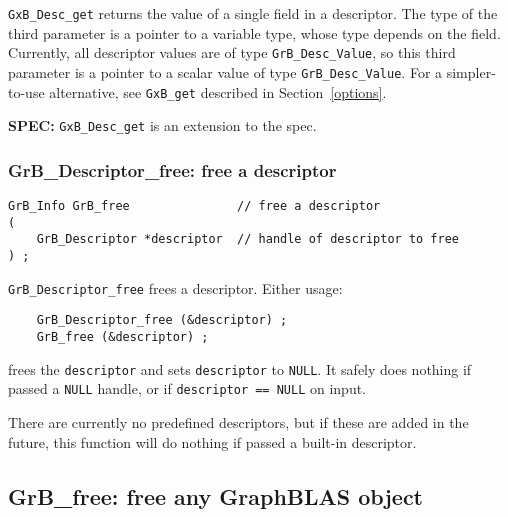\documentclass[12pt]{article}
\begin{document}
\verb'GxB_Desc_get' returns the value of a single field in a descriptor.  The
type of the third parameter is a pointer to a variable type, whose type depends
on the field.  Currently, all descriptor values are of type
\verb'GrB_Desc_Value', so this third parameter is a pointer to a scalar value of
type \verb'GrB_Desc_Value'.  For a simpler-to-use alternative, see
\verb'GxB_get' described in Section~\ref{options}.

\begin{spec}
{\bf SPEC:} \verb'GxB_Desc_get' is an extension to the spec.
\end{spec}

\newpage
\subsubsection{{\sf GrB\_Descriptor\_free:} free a descriptor}
\label{descriptor_free}

\begin{mdframed}[userdefinedwidth=6in]
{\footnotesize
\begin{verbatim}
GrB_Info GrB_free               // free a descriptor
(
    GrB_Descriptor *descriptor  // handle of descriptor to free
) ;
\end{verbatim} } \end{mdframed}

\verb'GrB_Descriptor_free' frees a descriptor.
Either usage:

    {\small
    \begin{verbatim}
    GrB_Descriptor_free (&descriptor) ;
    GrB_free (&descriptor) ; \end{verbatim}}

\noindent
frees the \verb'descriptor' and sets \verb'descriptor' to \verb'NULL'.  It
safely does nothing if passed a \verb'NULL' handle, or if
\verb'descriptor == NULL' on input.

There are currently no predefined descriptors, but if these are added in the
future, this function will do nothing if passed a built-in descriptor.

\newpage
\subsection{{\sf GrB\_free:} free any GraphBLAS object} %
\label{free}
\end{document}
